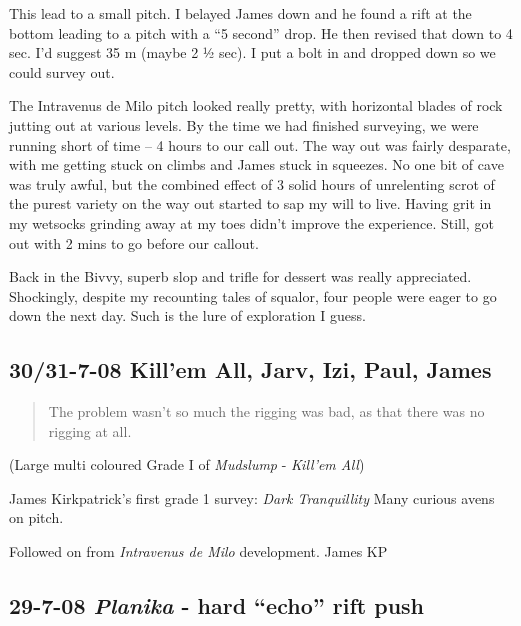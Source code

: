 This lead to a small pitch. I belayed James down and he found a rift at
the bottom leading to a pitch with a ``5 second'' drop. He then revised
that down to 4 sec. I'd suggest 35 m (maybe 2 ½ sec). I put a bolt in
and dropped down so we could survey out.

The Intravenus de Milo pitch looked really pretty, with horizontal
blades of rock jutting out at various levels. By the time we had
finished surveying, we were running short of time -- 4 hours to our call
out. The way out was fairly desparate, with me getting stuck on climbs
and James stuck in squeezes. No one bit of cave was truly awful, but the
combined effect of 3 solid hours of unrelenting scrot of the purest
variety on the way out started to sap my will to live. Having grit in my
wetsocks grinding away at my toes didn't improve the experience. Still,
got out with 2 mins to go before our callout.

Back in the Bivvy, superb slop and trifle for dessert was really
appreciated. Shockingly, despite my recounting tales of squalor, four
people were eager to go down the next day. Such is the lure of
exploration I guess.


\hypertarget{killem-all-jarv-izi-paul-james}{%
\subsection{30/31-7-08 Kill'em All, Jarv, Izi, Paul,
James}\label{killem-all-jarv-izi-paul-james}}

\begin{quote}The problem wasn't so much the rigging was bad, as that there was no rigging at all.
\end{quote}


(Large multi coloured Grade I of \emph{Mudslump} - \emph{Kill'em All})

James Kirkpatrick's first grade 1 survey: \emph{Dark Tranquillity} Many
curious avens on pitch.

Followed on from \emph{Intravenus de Milo} development. James KP

\hypertarget{planika---hard-echo-rift-push}{%
\subsection{\texorpdfstring{29-7-08 \emph{Planika} - hard ``echo'' rift
push}{29-7-08 Planika - hard ``echo'' rift push}}\label{planika---hard-echo-rift-push}}

